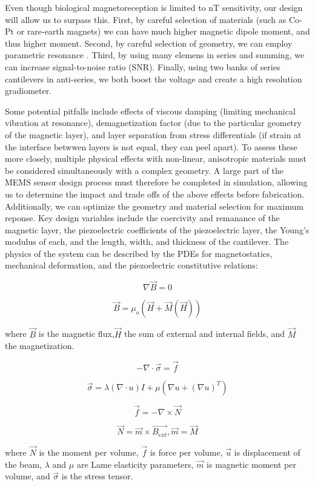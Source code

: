  Even though biological magnetoreception is limited to nT sensitivity, our design will allow us to surpass this. First, by careful selection of materials (such as Co-Pt or rare-earth magnets) \cite{coey2010magnetism, arnold2009permanent} we can have much higher magnetic dipole moment, and thus higher moment. Second, by careful selection of geometry, we can employ parametric resonance \cite{van2006resonant}. Third, by using many elemens in series and summing, we can increase signal-to-noise ratio (SNR). Finally, using two banks of series cantilevers in anti-series, we both boost the voltage and create a high resolution gradiometer.

 Some potential pitfalls include effects of viscous damping (limiting mechanical vibration at resonance), demagnetization factor (due to the particular geometry of the magnetic layer), and layer separation from stress differentials (if strain at the interface betwwen layers is not equal, they can peel apart). To assess these more closely, multiple physical effects with non-linear, anisotropic materials must be considered simultaneously with a complex geometry. A large part of the MEMS sensor design process must therefore be completed in simulation, allowing us to determine the impact and trade offs of the above effects before fabrication. Additionally, we can optimize the geometry and material selection for maximum reponse. Key design variables include the coercivity and remanance of the magnetic layer, the piezoelectric coefficients of the piezoelectric layer, the Young's modulus of each, and the length, width, and thickness of the cantilever. The physics of the system can be described by the PDEs for magnetostatics, mechanical deformation, and the piezoelectric constitutive relations:

 $$ \nabla \vec{B} = 0$$

 $$ \vec{B} = \mu_o(\vec{H}+\vec{M}(\vec{H}))$$

where $\vec{B}$ is the magnetic flux,$\vec{H}$ the sum of external and internal fields, and $\vec{M}$ the magnetization.
 
 $$ -\nabla\cdot\vec{\sigma}=\vec{f}$$
 
 $$ \vec{\sigma} = \lambda(\nabla\cdot u)I+\mu(\nabla u +(\nabla u)^T)$$

 $$ \vec{f} = -\nabla\times\vec{N}$$
 
$$ \vec{N} = \vec{m} \times \vec{B_{ext}}, \vec{m} = \vec{M} $$

where $\vec{N}$ is the moment per volume, $\vec{f}$ is force per volume, $\vec{u}$ is displacement of the beam, $\lambda$ and $\mu$ are Lame elasticity parameters, $\vec{m}$ is magnetic moment per volume, and $\vec{\sigma}$ is the stress tensor.

